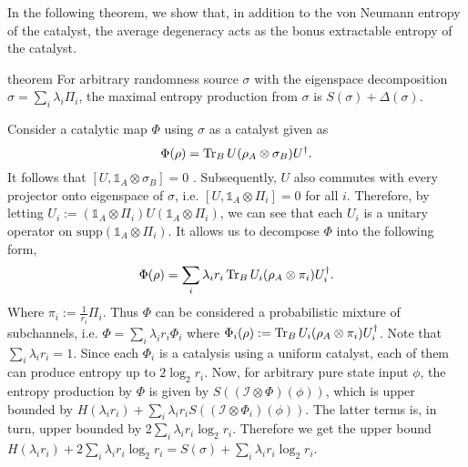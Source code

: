 \documentclass[aps, reprint, amsmath,amssymb, prx, superscriptaddress]{revtex4-2}
\begin{document}
In the following theorem, we show that, in addition to the von Neumann entropy of the catalyst, the average degeneracy acts as the bonus extractable entropy of the catalyst.
 
\begin{theoremEnd}{theorem} \label{thm:character}
    For arbitrary randomness source $\sigma$ with the eigenspace decomposition $\sigma=\sum_i \lambda_i \Pi_i$, the maximal entropy production from $\sigma$ is $S(\sigma) + \Delta(\sigma)$.
\end{theoremEnd}

\begin{proofEnd}
    Consider a catalytic map $\Phi$ using $\sigma$ as a catalyst given as
    \begin{equation}
        \Phi(\rho)=\Tr_B U(\rho_A \otimes \sigma_B)U^\dag.
    \end{equation}
    It follows that $\left[U,\mathds{1}_A \otimes \sigma_B \right]=0$ \cite{lie2020uniform}. Subsequently, $U$ also commutes with every projector onto eigenspace of $\sigma$, i.e. $\left[U,\mathds{1}_A \otimes \Pi_i \right]=0$ for all $i$. Therefore, by letting $U_i := (\mathds{1}_A \otimes \Pi_i) U (\mathds{1}_A \otimes \Pi_i)$, we can see that each $U_i$ is a unitary operator on $\text{supp}(\mathds{1}_A \otimes \Pi_i)$. It allows us to decompose $\Phi$ into the following form,
    \begin{equation}\label{eqn:convex}
        \Phi(\rho)=\sum_i  \lambda_i r_i \Tr_B U_i(\rho_A \otimes \pi_i)U_i^\dag.
    \end{equation}
    Where $\pi_i := \frac{1}{r_i}\Pi_i$. Thus $\Phi$ can be considered a probabilistic mixture of subchannels, i.e. $\Phi=\sum_i \lambda_i r_i \Phi_i$ where $\Phi_i (\rho) := \Tr_B U_i(\rho_A \otimes \pi_i)U_i^\dag$. Note that $\sum_i \lambda_i r_i = 1$. Since each $\Phi_i$ is a catalysis using a uniform catalyst, each of them can produce entropy up to $2\log_2  r_i$. Now, for arbitrary pure state input $\phi$, the entropy production by $\Phi$ is given by $S((\mathcal{I}\otimes \Phi)(\phi))$, which is upper bounded by $H(\lambda_i r_i) + \sum_i \lambda_i r_i S((\mathcal{I}\otimes \Phi_i)(\phi)).$ The latter terms is, in turn, upper bounded by 2$\sum_i \lambda_i r_i \log_2  r_i$. Therefore we get the upper bound $H(\lambda_i r_i) + 2\sum_i \lambda_i r_i \log_2  r_i = S(\sigma) + \sum_i \lambda_i r_i \log_2  r_i$.
    

\end{proofEnd}
\end{document}
